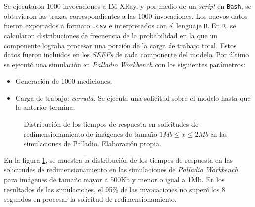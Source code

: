 Se ejecutaron 1000 invocaciones a IM-XRay, y por medio de un \emph{script} en \texttt{Bash}, se obtuvieron las trazas correspondientes a las 1000 invocaciones. Los nuevos datos fueron exportados a formato \texttt{.csv} e interpretados con el lenguaje \texttt{R}. En \texttt{R}, se calcularon distribuciones de frecuencia de la probabilidad en la que un componente lograba procesar una porción de la carga de trabajo total. Estos datos fueron incluidos en los \emph{SEEFs} de cada componente del modelo. Por último se ejecutó una simulación en \emph{Palladio Workbench} con los siguientes parámetros:
\begin{itemize}
    \item Generación de 1000 mediciones.
    \item Carga de trabajo: \emph{cerrada}. Se ejecuta una solicitud sobre el modelo hasta que la anterior termina. 
\end{itemize}

\begin{figure}
\hspace{-1cm}
\caption[\hspace{0.2cm} Distribución de los tiempos de respuesta en solicitudes de redimensionamiento de imágenes de tamaño $1Mb \leq x \leq 2Mb$ en las simulaciones de Palladio]{Distribución de los tiempos de respuesta en solicitudes de redimensionamiento de imágenes de tamaño $1Mb \leq x \leq 2Mb$ en las simulaciones de Palladio. Elaboración propia.}
\label{fig:distribucion-simulacion-imagenes-hasta-2mb}
\end{figure}

En la figura \ref{fig:distribucion-simulacion-imagenes-hasta-2mb}, se muestra la distribución de los tiempos de respuesta en las solicitudes de redimensionamiento en las simulaciones de \emph{Palladio Workbench} para imágenes de tamaño mayor a 500Kb y menor o igual a 1Mb. En los resultados de las simulaciones, el 95\% de las invocaciones no superó los 8 segundos en procesar la solicitud de redimensionamiento.

